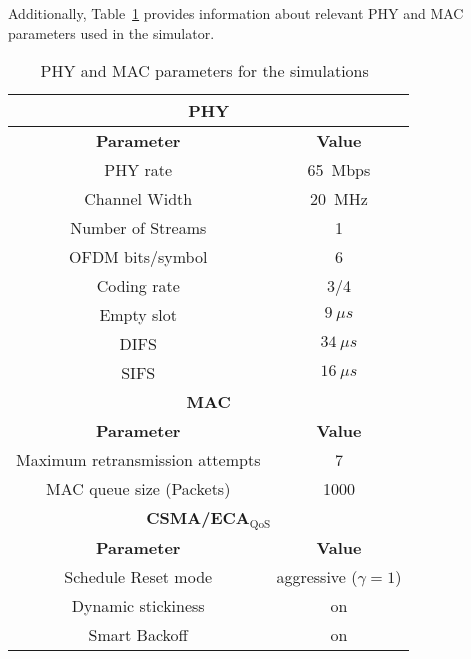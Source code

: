 \documentclass[a4paper]{article}
\begin{document}
Additionally, Table~\ref{tab:mac-params} provides information about relevant PHY and MAC parameters used in the simulator.
	\begin{table}[t]
		\centering
		\caption{PHY and MAC parameters for the simulations~\cite{CSMA-ECA-HEW}}
		\label{tab:mac-params}
		\begin{tabular}{|c|c|}
			\hline
			\multicolumn{2}{|c|}{{\bfseries PHY}}\\
			\hline
			{\bfseries Parameter} & {\bfseries Value}\\
			\hline
			PHY rate & 65~Mbps\\
			Channel Width & 20~MHz\\
			Number of Streams & 1\\
			OFDM bits/symbol & 6\\
			Coding rate & 3/4\\
			Empty slot & $9~\mu s$\\
			DIFS & $34~\mu s$\\
			SIFS & $16~\mu s$\\
			\hline
			\multicolumn{2}{|c|}{{\bfseries MAC}}\\
			\hline
			{\bfseries Parameter} & {\bfseries Value}\\
			\hline
			Maximum retransmission attempts & 7\\
MAC queue size (Packets) & 1000\\
			\hline
			\multicolumn{2}{|c|}{{\bfseries CSMA/ECA$_\text{QoS}$}}\\
			\hline
			{\bfseries Parameter} & {\bfseries Value}\\
			\hline
			Schedule Reset mode & aggressive ($\gamma=1$)\\
			Dynamic stickiness & on\\
			Smart Backoff & on\\
			\hline
		\end{tabular}
	\end{table}
	
\end{document}
